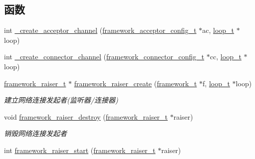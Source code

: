 \subsection*{函数}
\begin{DoxyCompactItemize}
\item 
int \hyperlink{a00057_ae1caed5e3ea73d6e6c98ddf1131310da_ae1caed5e3ea73d6e6c98ddf1131310da}{\+\_\+create\+\_\+acceptor\+\_\+channel} (\hyperlink{a00050_a61a4e424ff4c86631423dedd97c40064_a61a4e424ff4c86631423dedd97c40064}{framework\+\_\+acceptor\+\_\+config\+\_\+t} $\ast$ac, \hyperlink{a00050_a9c3ad1cd2de83e09f3a7b59fa82c94ee_a9c3ad1cd2de83e09f3a7b59fa82c94ee}{loop\+\_\+t} $\ast$loop)
\item 
int \hyperlink{a00057_a27b26fed4e5ce2f25ec573aa736dfe54_a27b26fed4e5ce2f25ec573aa736dfe54}{\+\_\+create\+\_\+connector\+\_\+channel} (\hyperlink{a00050_a81253f4c995b97e69be0e67f7a26097f_a81253f4c995b97e69be0e67f7a26097f}{framework\+\_\+connector\+\_\+config\+\_\+t} $\ast$cc, \hyperlink{a00050_a9c3ad1cd2de83e09f3a7b59fa82c94ee_a9c3ad1cd2de83e09f3a7b59fa82c94ee}{loop\+\_\+t} $\ast$loop)
\item 
\hyperlink{a00050_aa3ac31db191829c9e6db624d660a2563_aa3ac31db191829c9e6db624d660a2563}{framework\+\_\+raiser\+\_\+t} $\ast$ \hyperlink{a00057_a6a305a33afdea0d9b774d4b987aff05e_a6a305a33afdea0d9b774d4b987aff05e}{framework\+\_\+raiser\+\_\+create} (\hyperlink{a00050_a6149d769f6f07ed14a40a271c95d8463_a6149d769f6f07ed14a40a271c95d8463}{framework\+\_\+t} $\ast$f, \hyperlink{a00050_a9c3ad1cd2de83e09f3a7b59fa82c94ee_a9c3ad1cd2de83e09f3a7b59fa82c94ee}{loop\+\_\+t} $\ast$loop)
\begin{DoxyCompactList}\small\item\em 建立网络连接发起者(监听器/连接器) \end{DoxyCompactList}\item 
void \hyperlink{a00057_aeb1e0bff411b59cc3ec79da5ab23d2c1_aeb1e0bff411b59cc3ec79da5ab23d2c1}{framework\+\_\+raiser\+\_\+destroy} (\hyperlink{a00050_aa3ac31db191829c9e6db624d660a2563_aa3ac31db191829c9e6db624d660a2563}{framework\+\_\+raiser\+\_\+t} $\ast$raiser)
\begin{DoxyCompactList}\small\item\em 销毁网络连接发起者 \end{DoxyCompactList}\item 
int \hyperlink{a00057_a72206fc25182b20ead062464ed0b1139_a72206fc25182b20ead062464ed0b1139}{framework\+\_\+raiser\+\_\+start} (\hyperlink{a00050_aa3ac31db191829c9e6db624d660a2563_aa3ac31db191829c9e6db624d660a2563}{framework\+\_\+raiser\+\_\+t} $\ast$raiser)

\end{DoxyCompactItemize}
